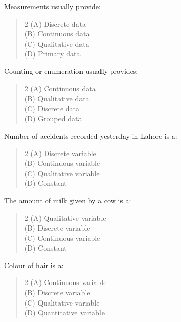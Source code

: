\documentclass[11pt,a4paper]{article}
\begin{document}
\begin{mcqlist}
\item Measurements usually provide:
\begin{quote}\begin{multicols}{2}
\noindent (A) Discrete data \\
(B) Continuous data \\
(C) Qualitative data \\
(D) Primary data
\end{multicols}\end{quote}

\item Counting or enumeration usually provides:
\begin{quote}\begin{multicols}{2}
\noindent (A) Continuous data \\
(B) Qualitative data \\
(C) Discrete data \\
(D) Grouped data
\end{multicols}\end{quote}

\item Number of accidents recorded yesterday in Lahore is a:
\begin{quote}\begin{multicols}{2}
\noindent (A) Discrete variable \\
(B) Continuous variable \\
(C) Qualitative variable \\
(D) Constant
\end{multicols}\end{quote}

\item The amount of milk given by a cow is a:
\begin{quote}\begin{multicols}{2}
\noindent (A) Qualitative variable \\
(B) Discrete variable \\
(C) Continuous variable \\
(D) Constant
\end{multicols}\end{quote}

\item Colour of hair is a:
\begin{quote}\begin{multicols}{2}
\noindent (A) Continuous variable \\
(B) Discrete variable \\
(C) Qualitative variable \\
(D) Quantitative variable
\end{multicols}\end{quote}


\end{mcqlist}
\end{document}
